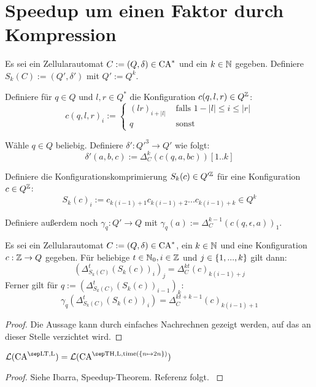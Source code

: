 \section{Speedup um einen Faktor durch Kompression}

\begin{definition}
    \label{factorSpeedupConstruction}
    Es sei ein Zellularautomat $C := (Q, \delta) \in \textrm{CA}^*$ und ein $k \in \mathbb{N}$ gegeben.
    Definiere $S_k(C) := (Q', \delta')$ mit $Q' := Q^k$.
    
    Definiere für $q \in Q$ und $l, r \in Q^*$ die Konfiguration $c(q, l, r) \in Q^{\mathbb{Z}}$:
    \[
        c(q, l, r)_i := \begin{cases}
            (lr)_{i + |l|} & \text{ falls } 1-|l| \leq i \leq |r| \\
            q & \text{ sonst}
        \end{cases}
    \]
    
    Wähle $q \in Q$ beliebig.
    Definiere $\delta' : {Q'}^3 \to Q'$ wie folgt:
    \[
        \delta'(a, b, c) := \Delta_C^k(c(q, a, bc))[1..k]
    \]
    
    Definiere die Konfigurationskomprimierung $S_k(c) \in Q'^{\mathbb{Z}}$ für eine Konfiguration $c \in Q^{\mathbb{Z}}$:
    \[
        S_k(c)_i := c_{k(i - 1) + 1}c_{k(i - 1) + 2}...c_{k(i - 1) + k} \in Q^k
    \]
    
    Definiere außerdem noch $\gamma_q : Q' \to Q$ mit
    $\gamma_q(a) := \Delta^{k-1}_C(c(q, \epsilon, a))_1$.
\end{definition}


\begin{satz}
    \label{factorSpeedupConstructionCorrectness}
    Es sei ein Zellularautomat $C := (Q, \delta) \in \textrm{CA}^*$, ein $k \in \mathbb{N}$ und eine Konfiguration $c: \mathbb{Z} \to Q$ gegeben.
    Für beliebige $t \in \mathbb{N}_0, i \in \mathbb{Z}$ und $j \in \{ {1, ..., k} \}$ gilt dann:
    \[
        (\Delta^t_{S_k(C)}(S_k(c))_i)_j = \Delta^{kt}_C(c)_{k(i-1)+j}
    \]
    Ferner gilt für $q := (\Delta^t_{S_k(C)}(S_k(c))_{i-1})_k$:
    \[
        \gamma_{q}( \Delta^t_{S_k(C)}(S_k(c))_{i} )
        = \Delta^{kt+k-1}_C(c)_{k(i-1)+1}
    \]
\end{satz}
\begin{proof}
    Die Aussage kann durch einfaches Nachrechnen gezeigt werden, auf das an dieser Stelle verzichtet wird.
\end{proof}



\begin{satz}
    \label{linSpeedup}
    $\CAL{\CALT, \CALeft} = \CAL{\CAT, \CALeft, \mathrm{time}(\finset{ n \mapsto 2n }) }$
\end{satz}
\begin{proof}
    Siehe Ibarra, Speedup-Theorem. Referenz folgt.
    \cite{MAZOYER199259}
\end{proof}

